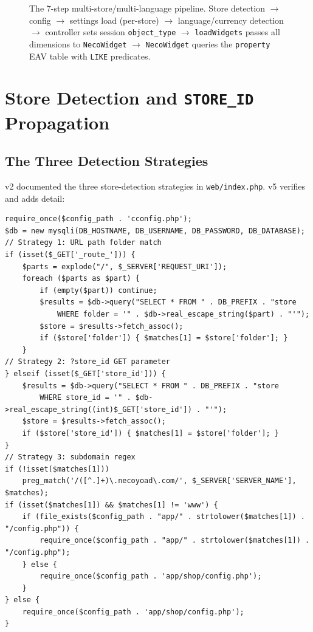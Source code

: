 \documentclass[11pt,a4paper]{article}
\begin{document}
\begin{figure}[htbp]
{%
}
\caption{The 7-step multi-store/multi-language pipeline. Store detection
$\to$ config $\to$ settings load (per-store) $\to$ language/currency
detection $\to$ controller sets session \texttt{object\_type} $\to$
\texttt{loadWidgets} passes all dimensions to \texttt{NecoWidget} $\to$
\texttt{NecoWidget} queries the \texttt{property} EAV table with
\texttt{LIKE} predicates.}
\label{fig:overview}
\end{figure}

\section{Store Detection and \texttt{STORE\_ID} Propagation}\label{sec:store-detection}

\subsection{The Three Detection Strategies}

v2 documented the three store-detection strategies in
\texttt{web/index.php}. v5 verifies and adds detail:

\begin{lstlisting}[caption={Store detection in \texttt{web/index.php} (abridged).},label={lst:store-detection}]
require_once($config_path . 'cconfig.php');
$db = new mysqli(DB_HOSTNAME, DB_USERNAME, DB_PASSWORD, DB_DATABASE);
// Strategy 1: URL path folder match
if (isset($_GET['_route_'])) {
    $parts = explode("/", $_SERVER['REQUEST_URI']);
    foreach ($parts as $part) {
        if (empty($part)) continue;
        $results = $db->query("SELECT * FROM " . DB_PREFIX . "store
            WHERE folder = '" . $db->real_escape_string($part) . "'");
        $store = $results->fetch_assoc();
        if ($store['folder']) { $matches[1] = $store['folder']; }
    }
// Strategy 2: ?store_id GET parameter
} elseif (isset($_GET['store_id'])) {
    $results = $db->query("SELECT * FROM " . DB_PREFIX . "store
        WHERE store_id = '" . $db->real_escape_string((int)$_GET['store_id']) . "'");
    $store = $results->fetch_assoc();
    if ($store['store_id']) { $matches[1] = $store['folder']; }
}
// Strategy 3: subdomain regex
if (!isset($matches[1]))
    preg_match('/([^.]+)\.necoyoad\.com/', $_SERVER['SERVER_NAME'], $matches);
if (isset($matches[1]) && $matches[1] != 'www') {
    if (file_exists($config_path . "app/" . strtolower($matches[1]) . "/config.php")) {
        require_once($config_path . "app/" . strtolower($matches[1]) . "/config.php");
    } else {
        require_once($config_path . 'app/shop/config.php');
    }
} else {
    require_once($config_path . 'app/shop/config.php');
}
\end{lstlisting}
\end{document}

